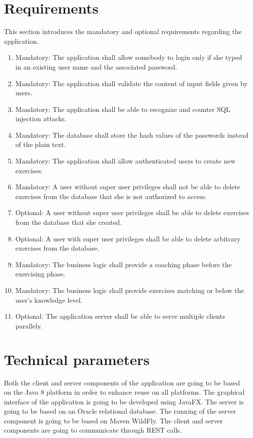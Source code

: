 \documentclass[a4paper]{article}
\begin{document}
	
	\section{Requirements}
	This section introduces the mandatory and optional requirements regarding the application.
	\begin{enumerate}
		\item Mandatory: The application shall allow somebody to login only if she typed in an existing user name and the associated password.
		\item Mandatory:  The application shall validate the content of input fields given by users.
		\item Mandatory:  The application shall be able to recognize and counter SQL injection attacks.
		\item Mandatory:  The database shall store the hash values of the passwords instead of the plain text.
		\item Mandatory: The application shall allow authenticated users to create new exercises.
		\item Mandatory: A user without super user privileges shall not be able to delete exercises from the database that she is not authorized to access.
		\item Optional: A user without super user privileges shall be able to delete exercises from the database that she created.
		\item Optional: A user with super user privileges shall be able to delete arbitrary exercises from the database.
		\item Mandatory: The business logic shall provide a coaching phase before the exercising phase.
		\item  Mandatory:  The business logic shall provide exercises matching or below the user's knowledge level.
		\item Optional: The application server shall be able to serve multiple clients parallely. 

	\end{enumerate}
	
	\section{Technical parameters}
	Both the client and server components of the application are going to be based on the Java 8 platform in order to enhance reuse on all platforms. The graphical interface of the application is going to be developed using JavaFX. The server is going to be based on an Oracle relational database. The running of the server component is going to be based on Maven WildFly. The client and server components are going to communicate through REST calls.
	
\end{document}
